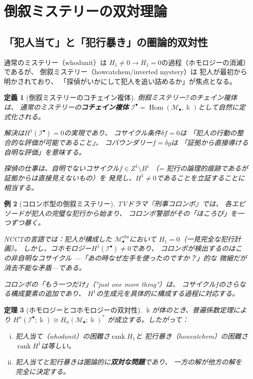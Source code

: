 \documentclass[12pt,twocolumn]{ltjsarticle}
\newtheorem{theorem}{定理}[section]
\newtheorem{definition}[theorem]{定義}
\newtheorem{example}[theorem]{例}
\newcommand{\Hom}{\operatorname{Hom}}
\renewcommand{\rank}{\operatorname{rank}}
\newcommand{\Mys}{\mathcal{M}}
\newcommand{\kk}{\Bbbk}
\newcommand{\Inv}{\mathcal{I}}
\begin{document}
\section{倒叙ミステリーの双対理論}
\label{sec:howcatchem}

\subsection{「犯人当て」と「犯行暴き」の圏論的双対性}

通常のミステリー（whodunit）は
$H_1 \neq 0 \to H_1 = 0$の過程（ホモロジーの消滅）であるが、
倒叙ミステリー（howcatchem/inverted mystery）は
犯人が最初から明かされており、
「探偵がいかにして犯人を追い詰めるか」が焦点となる。

\begin{definition}[倒叙ミステリーのコチェイン複体]
倒叙ミステリー$\Inv$のチェイン複体は、
通常のミステリーの\textbf{コチェイン複体}
$\Inv^\bullet = \Hom(\Mys_\bullet, \kk)$として自然に定式化される。

解決は$H^1(\Inv^\bullet) = 0$の実現であり、
コサイクル条件$\delta f = 0$は
「犯人の行動の整合的な評価が可能であること」、
コバウンダリー$f = \delta g$は
「証拠から直接導ける自明な評価」を意味する。

探偵の仕事は、自明でないコサイクル$f \in Z^1 \setminus B^1$
（= 犯行の論理的痕跡であるが証拠からは直接見えないもの）を
発見し、$H^1 \neq 0$であることを立証することに相当する。
\end{definition}

\begin{example}[コロンボ型の倒叙ミステリー]
TVドラマ『刑事コロンボ』では、
各エピソードが犯人の完璧な犯行から始まり、
コロンボ警部がその「ほころび」を一つずつ暴く。

NCCTの言語では：犯人が構成した
$\Mys^{\mathrm{obs}}_\bullet$において
$H_1 = 0$（一見完全な犯行計画）。
しかし、コホモロジー$H^1(\Inv^\bullet) \neq 0$であり、
コロンボが検出するのはこの非自明なコサイクル
---「あの時なぜ左手を使ったのですか？」的な
微細だが消去不能な矛盾---である。

コロンボの「もう一つだけ」（"just one more thing"）は、
コサイクル$f$のさらなる構成要素の追加であり、
$H^1$の生成元を具体的に構成する過程に対応する。
\end{example}

\begin{theorem}[ホモロジーとコホモロジーの双対性]
\label{thm:duality_mystery}
$\kk$が体のとき、普遍係数定理により
$H^n(\Inv^\bullet; \kk) \cong H_n(\Mys_\bullet; \kk)^*$
が成立する。したがって：
\begin{enumerate}[(i)]
\item \emph{犯人当て}（whodunit）の困難さ$\rank H_1$と
\emph{犯行暴き}（howcatchem）の困難さ$\rank H^1$は等しい。
\item 犯人当てと犯行暴きは圏論的に\textbf{双対な問題}であり、
一方の解が他方の解を完全に決定する。
\end{enumerate}
\end{theorem}
\end{document}
